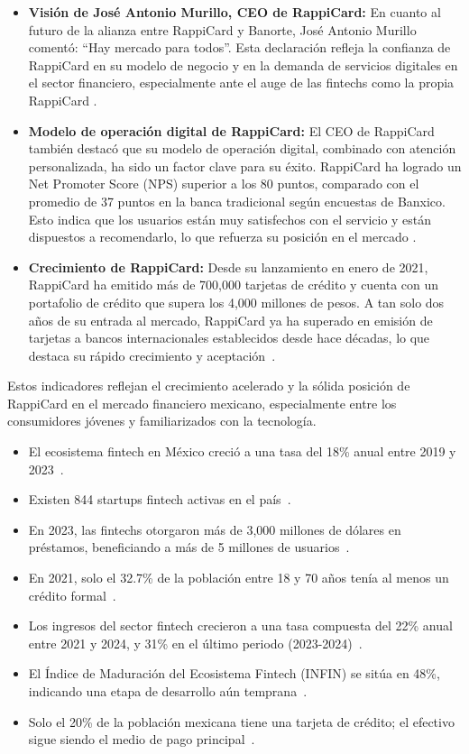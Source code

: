 \begin{itemize}
    \item \textbf{Visión de José Antonio Murillo, CEO de RappiCard:} En cuanto al futuro de la alianza entre RappiCard y Banorte, José Antonio Murillo comentó: “Hay mercado para todos”. Esta declaración refleja la confianza de RappiCard en su modelo de negocio y en la demanda de servicios digitales en el sector financiero, especialmente ante el auge de las fintechs como la propia RappiCard \cite{forbesrappibanorte}.
    \item \textbf{Modelo de operación digital de RappiCard:} El CEO de RappiCard también destacó que su modelo de operación digital, combinado con atención personalizada, ha sido un factor clave para su éxito. RappiCard ha logrado un Net Promoter Score (NPS) superior a los 80 puntos, comparado con el promedio de 37 puntos en la banca tradicional según encuestas de Banxico. Esto indica que los usuarios están muy satisfechos con el servicio y están dispuestos a recomendarlo, lo que refuerza su posición en el mercado \cite{forbesrappibanorte}.
    \item \textbf{Crecimiento de RappiCard:} Desde su lanzamiento en enero de 2021, RappiCard ha emitido más de 700,000 tarjetas de crédito y cuenta con un portafolio de crédito que supera los 4,000 millones de pesos. A tan solo dos años de su entrada al mercado, RappiCard ya ha superado en emisión de tarjetas a bancos internacionales establecidos desde hace décadas, lo que destaca su rápido crecimiento y aceptación~\cite{forbesrappibanorte}.
\end{itemize}

Estos indicadores reflejan el crecimiento acelerado y la sólida posición de RappiCard en el mercado financiero mexicano, especialmente entre los consumidores jóvenes y familiarizados con la tecnología.

\vspace{0.3cm}

\begin{itemize}
    \item El ecosistema fintech en México creció a una tasa del 18\% anual entre 2019 y 2023~\cite{dock2024}.
    \item Existen 844 startups fintech activas en el país~\cite{finnovating2024}.
    \item En 2023, las fintechs otorgaron más de 3,000 millones de dólares en préstamos, beneficiando a más de 5 millones de usuarios~\cite{uflow2024}.
    \item En 2021, solo el 32.7\% de la población entre 18 y 70 años tenía al menos un crédito formal~\cite{inegi2021}.
    \item Los ingresos del sector fintech crecieron a una tasa compuesta del 22\% anual entre 2021 y 2024, y 31\% en el último periodo (2023-2024)~\cite{reporteindigo2024}.
    \item El Índice de Maduración del Ecosistema Fintech (INFIN) se sitúa en 48\%, indicando una etapa de desarrollo aún temprana~\cite{santander2024}.
    \item Solo el 20\% de la población mexicana tiene una tarjeta de crédito; el efectivo sigue siendo el medio de pago principal~\cite{elfinanciero2024}.
\end{itemize}


